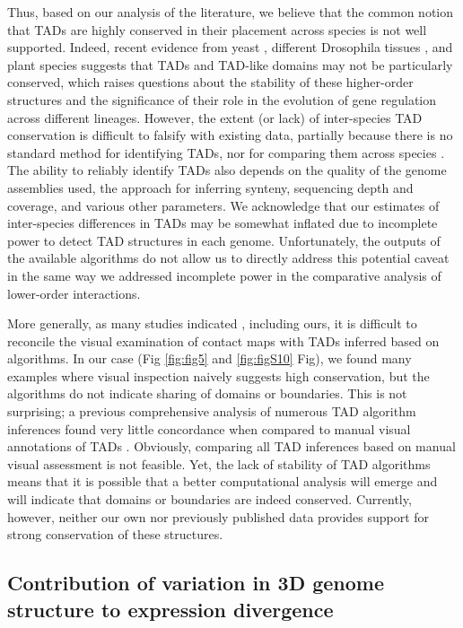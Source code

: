 Thus, based on our analysis of the literature, we believe that the common notion that TADs are highly conserved in their placement across species is not well supported. Indeed, recent evidence from yeast \cite{Tjong.2012}, different Drosophila tissues \cite{Rowley.2017}, and plant species \cite{Dong.2017} suggests that TADs and TAD-like domains may not be particularly conserved, which raises questions about the stability of these higher-order structures and the significance of their role in the evolution of gene regulation across different lineages. However, the extent (or lack) of inter-species TAD conservation is difficult to falsify with existing data, partially because there is no standard method for identifying TADs, nor for comparing them across species \cite{Dali.2017, Forcato.2017}. The ability to reliably identify TADs also depends on the quality of the genome assemblies used, the approach for inferring synteny, sequencing depth and coverage, and various other parameters. We acknowledge that our estimates of inter-species differences in TADs may be somewhat inflated due to incomplete power to detect TAD structures in each genome. Unfortunately, the outputs of the available algorithms do not allow us to directly address this potential caveat in the same way we addressed incomplete power in the comparative analysis of lower-order interactions.

More generally, as many studies indicated \cite{Dali.2017, Yan.2017, Sauerwald.2018}, including ours, it is difficult to reconcile the visual examination of contact maps with TADs inferred based on algorithms. In our case (Fig \ref{fig:fig5} and \ref{fig:figS10} Fig), we found many examples where visual inspection naively suggests high conservation, but the algorithms do not indicate sharing of domains or boundaries. This is not surprising; a previous comprehensive analysis of numerous TAD algorithm inferences found very little concordance when compared to manual visual annotations of TADs \cite{Dali.2017}. Obviously, comparing all TAD inferences based on manual visual assessment is not feasible. Yet, the lack of stability of TAD algorithms means that it is possible that a better computational analysis will emerge and will indicate that domains or boundaries are indeed conserved. Currently, however, neither our own nor previously published data provides support for strong conservation of these structures.

\subsection{Contribution of variation in 3D genome structure to expression divergence}

